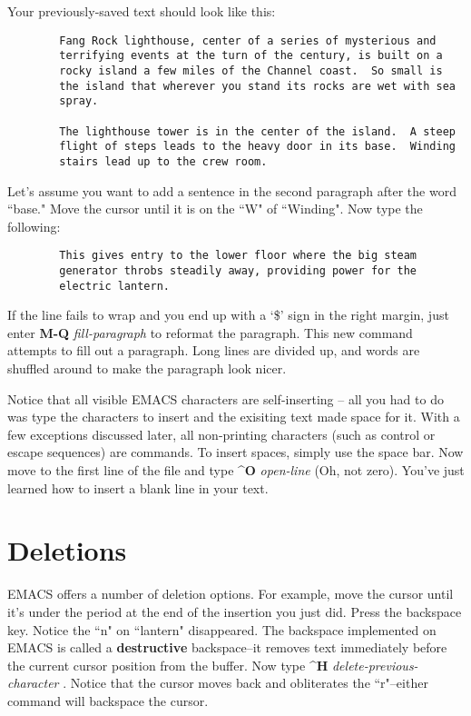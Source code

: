 Your previously-saved text should look like this:

\begin{verbatim}
        Fang Rock lighthouse, center of a series of mysterious and
        terrifying events at the turn of the century, is built on a
        rocky island a few miles of the Channel coast.  So small is
        the island that wherever you stand its rocks are wet with sea
        spray.

        The lighthouse tower is in the center of the island.  A steep
        flight of steps leads to the heavy door in its base.  Winding
        stairs lead up to the crew room.
\end{verbatim}

Let's assume you want to add a sentence in the second paragraph after
the word ``base."  Move the cursor until it is on the ``W" of ``Winding".
Now type the following:

\begin{verbatim}
        This gives entry to the lower floor where the big steam
        generator throbs steadily away, providing power for the
        electric lantern.
\end{verbatim}

If the line fails to wrap and you end up with a `\$' sign in the right
margin, just enter {\bf{}M-Q} {\it{}fill-paragraph}
 to reformat the paragraph.  This new command
attempts to fill out a paragraph.  Long lines are divided up, and
words are shuffled around to make the paragraph look nicer.

Notice that all visible EMACS characters are self-inserting -- all you
had to do was type the characters to insert and the exisiting text
made space for it.  With a few exceptions discussed later, all
non-printing characters (such as control or escape sequences) are
commands.  To insert spaces, simply use the space bar.  Now move to
the first line of the file and type {\bf{}\^{}O} {\it{}open-line}
 (Oh, not zero).  You've just learned how to insert a
blank line in your text.

\section{Deletions}

EMACS offers a number of deletion options.  For example, move the cursor
until it's under the period at the end of the insertion you just did.
Press the backspace key.  Notice the ``n" on ``lantern" disappeared.  The
backspace implemented on EMACS is called a {\bf{}destructive} backspace--it
removes text immediately before the current cursor position from the
buffer.  Now type {\bf{}\^{}H} {\it{}delete-previous-character}
.  Notice that the cursor moves back
and obliterates the ``r"--either command will backspace the cursor.

